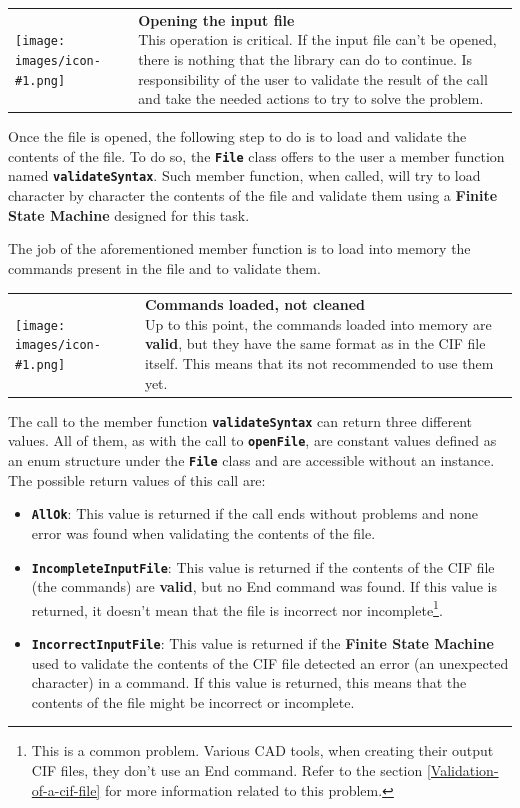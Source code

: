 \documentclass[11pt,twoside,openany,x11names,svgnames]{memoir}
\makeatletter
\newcommand{\IconNote}[3]
{
	\begin{table}[ht]
	\begin{tabular}{ lm{\dimexpr\textwidth-8\tabcolsep-\wd0}@{}}
		\toprule
		\texttt{[image: images/icon-\#1.png]}
		&
		\parbox[t]{155mm}{
		\textbf{#2} \\
		#3
		}
	\end{tabular}
\end{table}
}
\makeatother
\begin{document}
\IconNote
	{error}
	{Opening the input file}
	{This operation is critical. If the input file can't be opened, there is nothing that the library can do to continue. Is responsibility of the user to validate the result of the call and take the needed actions to try to solve the problem.}
	
Once the file is opened, the following step to do is to load and validate the contents of the file. To do so, the \textbf{\texttt{File}} class offers to the user a member function named \textbf{\texttt{validateSyntax}}. Such member function, when called, will try to load character by character the contents of the file and validate them using a \textbf{Finite State Machine} designed for this task.

The job of the aforementioned member function is to load into memory the commands present in the file and to validate them. 

\IconNote
	{warning}
	{Commands loaded, not cleaned}
	{Up to this point, the commands loaded into memory are \textbf{valid}, but they have the same format as in the CIF file itself. This means that its not recommended to use them yet.}
	
The call to the member function \textbf{\texttt{validateSyntax}} can return three different values. All of them, as with the call to \textbf{\texttt{openFile}}, are constant values defined as an enum structure under the \textbf{\texttt{File}} class and are accessible without an instance. The possible return values of this call are:

\begin{itemize}
	\item \textbf{\texttt{AllOk}}: This value is returned if the call ends without problems and none error was found when validating the contents of the file.
	
	\item \textbf{\texttt{IncompleteInputFile}}: This value is returned if the contents of the CIF file (the commands) are \textbf{valid}, but no End command was found. If this value is returned, it doesn't mean that the file is incorrect nor incomplete\footnote{This is a common problem. Various CAD tools, when creating their output CIF files, they don't use an End command. Refer to the section \ref{Validation-of-a-cif-file} for more information related to this problem.}.
	
	\item \textbf{\texttt{IncorrectInputFile}}: This value is returned if the \textbf{Finite State Machine} used to validate the contents of the CIF file detected an error (an unexpected character) in a command. If this value is returned, this means that the contents of the file might be incorrect or incomplete.
\end{itemize}
\end{document}
